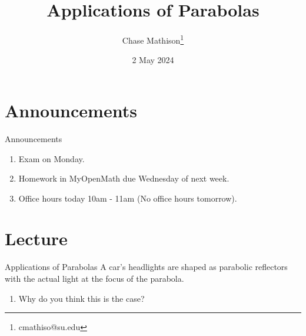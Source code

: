\documentclass[presentation]{beamer}
\institute[SU]{Shenandoah University}
\author{Chase Mathison\thanks{cmathiso@su.edu}}
\date{2 May 2024}
\title{Applications of Parabolas}
\begin{document}
\maketitle

\section{Announcements}
\label{sec:orgad87e06}
\begin{frame}[label={sec:orgeba262e}]{Announcements}
\begin{enumerate}
\item Exam on Monday.
\item Homework in MyOpenMath due Wednesday of next week.
\item Office hours today 10am - 11am (No office hours tomorrow).
\end{enumerate}
\end{frame}

\section{Lecture}
\label{sec:orgd0bcef5}
\begin{frame}[label={sec:orgdcf5d5d}]{Applications of Parabolas}
A car's headlights are shaped as parabolic reflectors with the actual light at the focus of the parabola.

\begin{enumerate}
\item Why do you think this is the case?
\end{enumerate}


\vspace{10in}
\end{frame}
\end{document}
